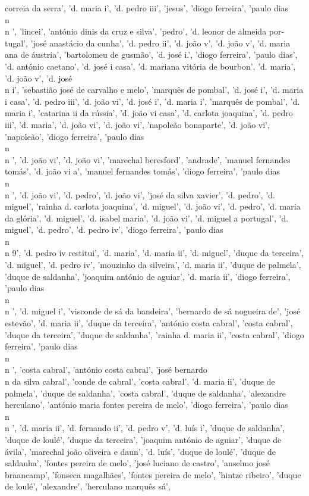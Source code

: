 \documentclass{article}
\begin{document}
\begin{itemize}
correia da serra', 'd. maria i', 'd. pedro iii', 'jesus', 'diogo ferreira', 'paulo dias\\n\\n ', 'lincei', 'antónio dinis da cruz e silva', 'pedro', 'd. leonor de almeida por-tugal', 'josé anastácio da cunha', 'd. pedro ii', 'd. joão v', 'd. joão v', 'd. maria ana de áustria', 'bartolomeu de gusmão', 'd. josé i.', 'diogo ferreira', 'paulo dias', 'd. antónio caetano', 'd. josé i casa', 'd. mariana vitória de bourbon', 'd. maria', 'd. joão v', 'd. josé\\n i', 'sebastião josé de carvalho e melo', 'marquês de pombal', 'd. josé i', 'd. maria i casa', 'd. pedro iii', 'd. joão vi', 'd. josé i', 'd. maria i', 'marquês de pombal', 'd. maria i', 'catarina ii da rússia', 'd. joão vi casa', 'd. carlota joaquina', 'd. pedro iii', 'd. maria', 'd. joão vi', 'd. joão vi', 'napoleão bonaparte', 'd. joão vi', 'napoleão', 'diogo ferreira', 'paulo dias\\n\\n ', 'd. joão vi', 'd. joão vi', 'marechal beresford', 'andrade', 'manuel fernandes tomás', 'd. joão vi a', 'manuel fernandes tomás', 'diogo ferreira', 'paulo dias\\n\\n ', 'd. joão vi', 'd. pedro', 'd. joão vi', 'josé da silva xavier', 'd. pedro', 'd. miguel', 'rainha d. carlota joaquina', 'd. miguel', 'd. joão vi', 'd. pedro', 'd. maria da glória', 'd. miguel', 'd. isabel maria', 'd. joão vi', 'd. miguel a portugal', 'd. miguel', 'd. pedro', 'd. pedro iv', 'diogo ferreira', 'paulo dias\\n\\n 9', 'd. pedro iv restitui', 'd. maria', 'd. maria ii', 'd. miguel', 'duque da terceira', 'd. miguel', 'd. pedro iv', 'mouzinho da silveira', 'd. maria ii', 'duque de palmela', 'duque de saldanha', 'joaquim antónio de aguiar', 'd. maria ii', 'diogo ferreira', 'paulo dias\\n\\n ', 'd. miguel i', 'visconde de sá da bandeira', 'bernardo de sá nogueira de', 'josé estevão', 'd. maria ii', 'duque da terceira', 'antónio costa cabral', 'costa cabral', 'duque da terceira', 'duque de saldanha', 'rainha d. maria ii', 'costa cabral', 'diogo ferreira', 'paulo dias\\n\\n ', 'costa cabral', 'antónio costa cabral', 'josé bernardo\\n da silva cabral', 'conde de cabral', 'costa cabral', 'd. maria ii', 'duque de palmela', 'duque de saldanha', 'costa cabral', 'duque de saldanha', 'alexandre herculano', 'antónio maria fontes pereira de melo', 'diogo ferreira', 'paulo dias\\n\\n ', 'd. maria ii', 'd. fernando ii', 'd. pedro v', 'd. luís i', 'duque de saldanha', 'duque de loulé', 'duque da terceira', 'joaquim antónio de aguiar', 'duque de ávila', 'marechal joão oliveira e daun', 'd. luís', 'duque de loulé', 'duque de saldanha', 'fontes pereira de melo', 'josé luciano de castro', 'anselmo josé braancamp', 'fonseca magalhães', 'fontes pereira de melo', 'hintze ribeiro', 'duque de loulé', 'alexandre', 'herculano marquês sá', 
\end{itemize}
\end{document}
